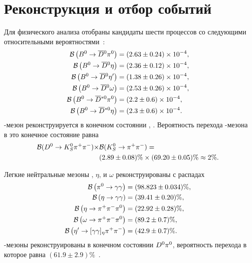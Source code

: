 \section{Реконструкция и отбор событий}\label{sec:event}
Для физического анализа отобраны кандидаты шести процессов \bdsth со следующими относительными вероятностями~\cite{pdg}:
\begin{equation}\label{eq:signal-modes}
 \begin{split}
  \mathcal{B}\left(B^0\to\overline{D}{}^0\pi^0  \right)  &= (2.63\pm0.24)\times 10^{-4},\\
  \mathcal{B}\left(B^0\to\overline{D}{}^0\eta \right)  &= (2.36\pm0.12)\times 10^{-4},\\
  \mathcal{B}\left(B^0\to\overline{D}{}^0\eta^{\prime}\right)  &= (1.38\pm0.26)\times 10^{-4},\\
  \mathcal{B}\left(B^0\to\overline{D}{}^0\omega\right) &= (2.53\pm0.26)\times 10^{-4},\\
  \mathcal{B}\left(B^0\to\overline{D}{}^{*0}\pi^0\right)  &= (2.2 \pm0.6 )\times 10^{-4},\\
  \mathcal{B}\left(B^0\to\overline{D}{}^{*0}\eta\right) &= (2.3 \pm0.6 )\times 10^{-4}.
 \end{split}
\end{equation}
\dn-мезон реконструируется в конечном состоянии \kspp, \kstopipi.  Вероятность перехода \dn-мезона в это конечное состояние равна~\cite{pdg}
\begin{equation}
\begin{split}
 \mathcal{B}(D^0\to K_S^0\pi^+\pi^-)\times&\mathcal{B}(K_S^0\to\pi^+\pi^-) = \\
 &(2.89\pm0.08)\% \times (69.20\pm0.05)\% \approx 2\%.
\end{split}
\end{equation}

Легкие нейтральные мезоны \pin, $\eta$, \etap и $\omega$ реконструированы с распадах~\cite{pdg}
\begin{equation}\label{eq:h0-modes}
\begin{split}
 \mathcal{B}\left(\pi^0\to\gamma\gamma\right)      &= (98.823 \pm 0.034)\%,\\
 \mathcal{B}\left(\eta\to\gamma\gamma\right)     &= (39.41  \pm 0.20)\%,\\
 \mathcal{B}\left(\eta\to\pi^+\pi^-\pi^0\right)    &= (22.92  \pm 0.28)\%,\\
 \mathcal{B}\left(\omega\to\pi^+\pi^-\pi^0\right)  &= (89.2   \pm 0.7)\%,\\
 \mathcal{B}\left(\eta^{\prime}\to[\gamma\gamma]_{\eta}\pi^+\pi^-\right) &= (42.9   \pm 0.7)\%.\\
\end{split}
\end{equation}
\dst-мезоны реконструированы в конечном состоянии $D^0\pi^0$,  вероятность перехода в которое равна $(61.9\pm2.9)\%$~\cite{pdg}.

